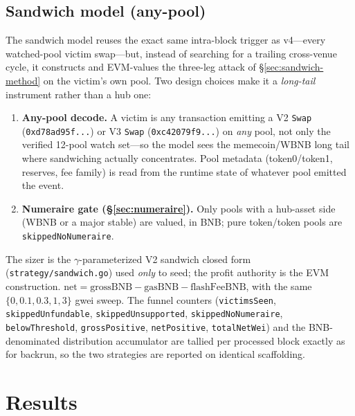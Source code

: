 \documentclass[11pt]{article}
\newcommand{\code}[1]{\texttt{#1}}
\begin{document}
\subsection{Sandwich model (any-pool)}
\label{sec:models-sandwich}
The sandwich model reuses the exact same intra-block trigger as v4---every
watched-pool victim swap---but, instead of searching for a trailing cross-venue
cycle, it constructs and EVM-values the three-leg attack of \S\ref{sec:sandwich-method}
on the victim's own pool. Two design choices make it a \emph{long-tail} instrument
rather than a hub one:
\begin{enumerate}
  \item \textbf{Any-pool decode.} A victim is any transaction emitting a V2 \code{Swap}
    (\code{0xd78ad95f...}) or V3 \code{Swap} (\code{0xc42079f9...}) on \emph{any} pool,
    not only the verified 12-pool watch set---so the model sees the memecoin/WBNB long
    tail where sandwiching actually concentrates. Pool metadata
    (token0/token1, reserves, fee family) is read from the runtime state of whatever
    pool emitted the event.
  \item \textbf{Numeraire gate (\S\ref{sec:numeraire}).} Only pools with a hub-asset
    side (WBNB or a major stable) are valued, in BNB; pure token/token pools are
    \code{skippedNoNumeraire}.
\end{enumerate}
The sizer is the $\gamma$-parameterized V2 sandwich closed form
(\code{strategy/sandwich.go}) used \emph{only} to seed; the profit authority is the
EVM construction. $\text{net}=\text{grossBNB}-\text{gasBNB}-\text{flashFeeBNB}$, with
the same $\{0,0.1,0.3,1,3\}$ gwei sweep. The funnel counters (\code{victimsSeen},
\code{skippedUnfundable}, \code{skippedUnsupported}, \code{skippedNoNumeraire},
\code{belowThreshold}, \code{grossPositive}, \code{netPositive}, \code{totalNetWei})
and the BNB-denominated distribution accumulator are tallied per processed block
exactly as for backrun, so the two strategies are reported on identical scaffolding.

\section{Results}
\end{document}

